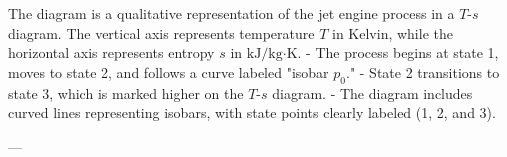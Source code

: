 The diagram is a qualitative representation of the jet engine process in a \( T \)-\( s \) diagram. The vertical axis represents temperature \( T \) in Kelvin, while the horizontal axis represents entropy \( s \) in \( \text{kJ}/\text{kg·K} \).  
- The process begins at state 1, moves to state 2, and follows a curve labeled "isobar \( p_0 \)."  
- State 2 transitions to state 3, which is marked higher on the \( T \)-\( s \) diagram.  
- The diagram includes curved lines representing isobars, with state points clearly labeled (1, 2, and 3).  

---